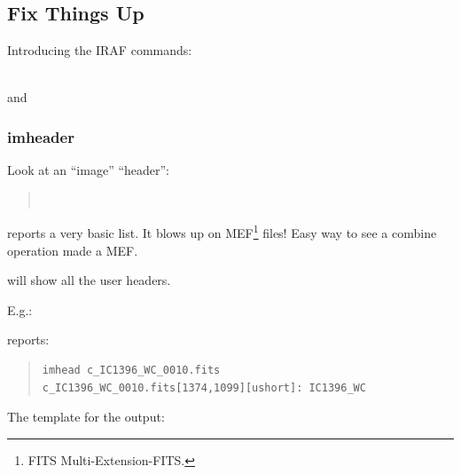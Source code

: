 \documentclass[letter,11pt,oneside]{article}
\begin{document}
\subsection{Fix Things Up}

Introducing the IRAF commands:  

{\color{verbcolor}{\verb#imheader#}}    \\
{\color{verbcolor}{\verb#hselect#}} and \\
{\color{verbcolor}{\verb#hedit#}}

\subsubsection{imheader}
Look at an ``image'' ``header'':

\begin{quote}
{\color{verbcolor}{\verb#imheader filelist#}} \\
{\color{verbcolor}{\verb#imheader filelist long+ user+ | less#}}
\end{quote}

{\color{verbcolor}{\verb#imheader filelist#}} reports a very basic
list. It blows up on MEF\footnote{FITS Multi-Extension-FITS.} files!
Easy way to see a combine operation made a MEF.

\begin{quote}
{\color{verbcolor}{\verb#imheader filelist long+ user+#}}
\end{quote}

will show all the user headers.

E.g.:

\begin{quote}
{\color{verbcolor}{\verb#imhead c_IC1396_WC_0010.fits#}}
\end{quote}

reports:

{\color{darkgreen}
\begin{quote}
\begingroup \fontsize{10pt}{10pt}
\selectfont
\begin{verbatim}
imhead c_IC1396_WC_0010.fits
c_IC1396_WC_0010.fits[1374,1099][ushort]: IC1396_WC
\end{verbatim}
\endgroup
\end{quote}
}
The template for the output:

\begin{quote}
{\color{darkgreen}{\verb#filename[NAXIS1,NAXIS2][16-bit integer]: OBJECT#}}
\end{quote}
\end{document}
